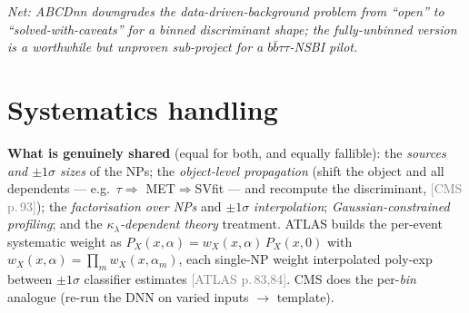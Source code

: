 \documentclass[11pt]{article}
\newcommand{\kl}{\ensuremath{\kappa_\lambda}}
\newcommand{\bbtt}{\ensuremath{b\bar b\tau\tau}}
\newcommand{\pA}[1]{\textcolor{gray}{\small[ATLAS p.\,#1]}}
\newcommand{\pC}[1]{\textcolor{gray}{\small[CMS p.\,#1]}}
\begin{document}
\noindent\emph{Net: ABCDnn downgrades the data-driven-background problem from ``open'' to ``solved-with-caveats''
for a \emph{binned} discriminant shape; the fully-unbinned version is a worthwhile but unproven sub-project for a
\bbtt-NSBI pilot.}

\section{Systematics handling}
\textbf{What is genuinely shared} (equal for both, and equally fallible): the \emph{sources and $\pm1\sigma$ sizes}
of the NPs; the \emph{object-level propagation} (shift the object and all dependents --- e.g.\ $\tau\Rightarrow$
MET$\Rightarrow$SVfit --- and recompute the discriminant, \pC{93}); the \emph{factorisation over NPs} and
$\pm1\sigma$ \emph{interpolation}; \emph{Gaussian-constrained profiling}; and the \emph{\kl-dependent theory}
treatment. ATLAS builds the per-event systematic weight as $P_X(x,\alpha)=w_X(x,\alpha)\,P_X(x,0)$ with
$w_X(x,\alpha)=\prod_m w_X(x,\alpha_m)$, each single-NP weight interpolated poly-exp between $\pm1\sigma$ classifier
estimates \pA{83,84}. CMS does the per-\emph{bin} analogue (re-run the DNN on varied inputs $\to$ template).
\end{document}
